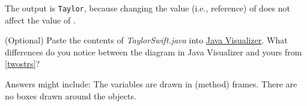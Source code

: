 \begin{answer}
The output is \texttt{Taylor}, because changing the value (i.e., reference) of  does not affect the value of .
\end{answer}


\Q (Optional) Paste the contents of \textit{TaylorSwift.java} into \href{https://cscircles.cemc.uwaterloo.ca/java_visualize/#code=public+class+ClassNameHere+%7B%0A++++public+static+void+main(String%5B%5D+args)+%7B%0A++++++++%0A++++%7D%0A%7D&mode=edit&showStringsAsObjects=1}{Java Visualizer}.
What differences do you notice between the diagram in Java Visualizer and yours from \ref{twostrs}?

\begin{answer}[5em]
Answers might include:
\bull The variables are drawn in (method) frames.
\bull There are no boxes drawn around the objects.
\end{answer}
